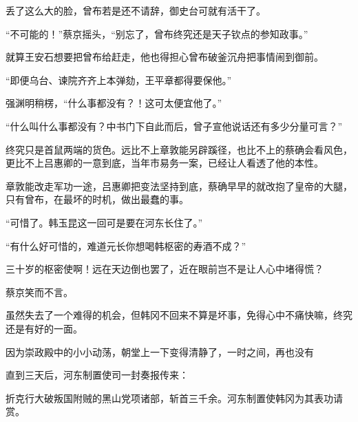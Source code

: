 丢了这么大的脸，曾布若是还不请辞，御史台可就有活干了。

“不可能的！”蔡京摇头，“别忘了，曾布终究还是天子钦点的参知政事。”

就算王安石想要把曾布给赶走，他也得担心曾布破釜沉舟把事情闹到御前。

“即便乌台、谏院齐齐上本弹劾，王平章都得要保他。”

强渊明稍楞，“什么事都没有？！这可太便宜他了。”

“什么叫什么事都没有？中书门下自此而后，曾子宣他说话还有多少分量可言？”

终究只是首鼠两端的货色。远比不上章敦能另辟蹊径，也比不上的蔡确会看风色，更比不上吕惠卿的一意到底，当年市易务一案，已经让人看透了他的本性。

章敦能改走军功一途，吕惠卿把变法坚持到底，蔡确早早的就改抱了皇帝的大腿，只有曾布，在最坏的时机，做出最蠢的事。

“可惜了。韩玉昆这一回可是要在河东长住了。”

“有什么好可惜的，难道元长你想喝韩枢密的寿酒不成？”

三十岁的枢密使啊！远在天边倒也罢了，近在眼前岂不是让人心中堵得慌？

蔡京笑而不言。

虽然失去了一个难得的机会，但韩冈不回来不算是坏事，免得心中不痛快嘛，终究还是有好的一面。

因为崇政殿中的小小动荡，朝堂上一下变得清静了，一时之间，再也没有

直到三天后，河东制置使司一封奏报传来：

折克行大破叛国附贼的黑山党项诸部，斩首三千余。河东制置使韩冈为其表功请赏。
